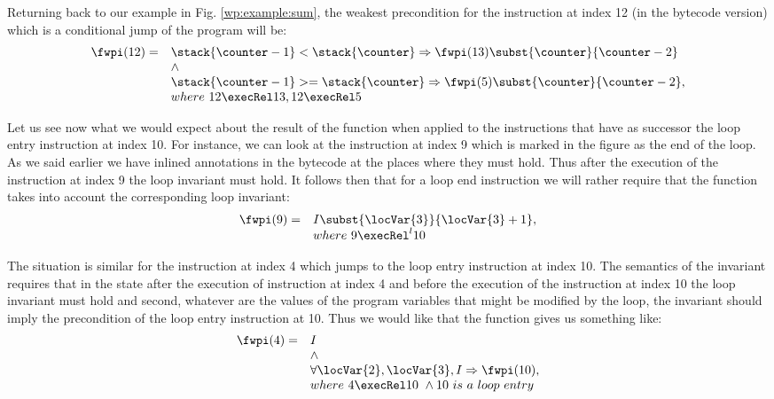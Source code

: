 Returning back to our example in Fig. \ref{wp:example:sum}, the weakest precondition for the instruction at index 12 (in the bytecode version) 
which is a conditional jump  of the program will be:
$$ \begin{array}{ll} \fwpi( 12 )  = & 
                      \stack{\counter - 1} < \stack{\counter} \Rightarrow   \fwpi(13) \subst{\counter}{\counter - 2} \\
                      &\wedge \\
		      &\stack{\counter - 1} >= \stack{\counter} \Rightarrow   \fwpi(5)\subst{\counter}{\counter - 2}, \\
		      & where \ 12 \execRel 13, 12 \execRel 5
   \end{array}
		      $$

Let us see now what  we would expect about the result of   the function \fwpi{} when applied to the instructions
that have as successor the loop entry instruction at index 10. For instance, we can look at the instruction
at index 9 which is marked in the figure as the end of the loop. 
As we said earlier we have inlined annotations in the bytecode at the places where they must hold. Thus after the execution
of the instruction at index 9  the loop invariant must hold. It follows then that for a loop end instruction 
we will rather require that the \fwpi{} function takes into account the corresponding loop invariant:
$$ \begin{array}{ll} \fwpi( 9 )  = &
                    I \subst{\locVar{3}}{\locVar{3} + 1}, \\
		     & where \ 9 \execRel^l 10 
		     \end{array}$$


The situation is  similar  for the instruction at index 4 which jumps to the loop entry instruction at index 10. 
The semantics of the invariant requires that  in the state after the execution of instruction at index 4 and before the execution 
of the instruction at index 10 the loop invariant must hold
and second,  whatever are the values
of the program variables that might be modified by the loop, the invariant should imply the precondition of the loop entry instruction at 10.
 Thus we would like that  the function \fwpi{} gives us something like: 
   $$\begin{array}{ll} \fwpi( 4 ) =& 
                    I \\
		    &\wedge \\
		    &\forall \locVar{2}, \locVar{3},  I  \Rightarrow \fwpi(10), \\
			&    where \ 4 \execRel 10 \ \wedge 10 \ is \ a \ loop \ entry   
      \end{array}
                 $$

